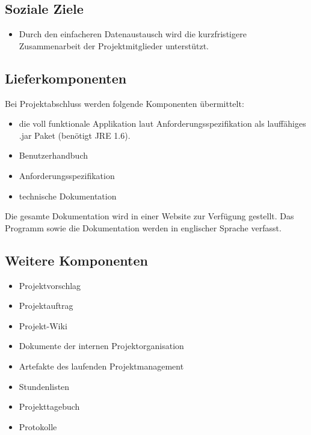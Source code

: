 \subsection{Soziale Ziele}
\begin{itemize}
\item Durch den einfacheren Datenaustausch wird die kurzfristigere Zusammenarbeit der Projektmitglieder unterstützt.
\end{itemize}

\subsection{Lieferkomponenten}
Bei Projektabschluss werden folgende Komponenten übermittelt:
\begin{itemize}
\item die voll funktionale Applikation laut Anforderungsspezifikation als lauffähiges .jar Paket (benötigt JRE 1.6).
\item Benutzerhandbuch
\item Anforderungsspezifikation
\item technische Dokumentation
\end{itemize}

Die gesamte Dokumentation wird in einer Website zur Verfügung gestellt. Das Programm sowie die Dokumentation werden in englischer Sprache verfasst.

\subsection{Weitere Komponenten}
\begin{itemize}
\item Projektvorschlag
\item Projektauftrag
\item Projekt-Wiki
\item Dokumente der internen Projektorganisation
\item Artefakte des laufenden Projektmanagement
\item Stundenlisten
\item Projekttagebuch
\item Protokolle
\end{itemize}
